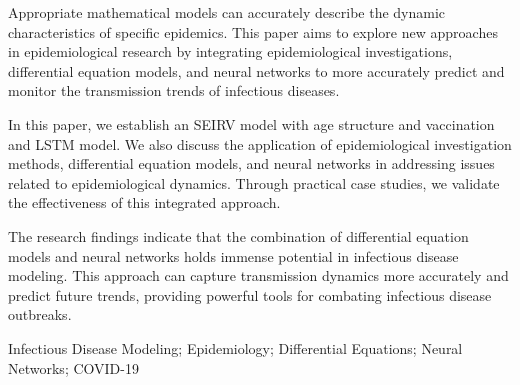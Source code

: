\begin{abstract_en}

	Appropriate mathematical models can accurately describe the dynamic characteristics of specific epidemics.
	This paper aims to explore new approaches in epidemiological research by integrating epidemiological investigations, differential equation models, and neural networks to more accurately predict and monitor the transmission trends of infectious diseases.

	In this paper, we establish an SEIRV model with age structure and vaccination and LSTM model.
	We also discuss the application of epidemiological investigation methods, differential equation models, and neural networks in addressing issues related to epidemiological dynamics.
	Through practical case studies, we validate the effectiveness of this integrated approach.

	The research findings indicate that the combination of differential equation models and neural networks holds immense potential in infectious disease modeling.
	This approach can capture transmission dynamics more accurately and predict future trends, providing powerful tools for combating infectious disease outbreaks.
\end{abstract_en}

\begin{keywords_en}
	Infectious Disease Modeling;
	Epidemiology;
	Differential Equations;
	Neural Networks;
	COVID-19
\end{keywords_en}